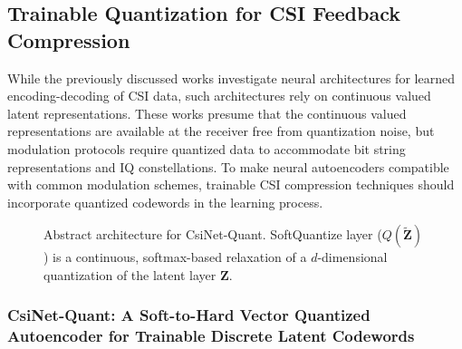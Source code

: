 
\subsection{Trainable Quantization for CSI Feedback Compression}

While the previously discussed works investigate neural architectures for learned encoding-decoding of CSI data, such architectures rely on continuous valued latent representations. These works presume that the continuous valued representations are available at the receiver free from quantization noise, but modulation protocols require quantized data to accommodate bit string representations and IQ constellations. To make neural autoencoders compatible with common modulation schemes, trainable CSI compression techniques should incorporate quantized codewords in the learning process.

\begin{figure}[!hbtp]
\centering
\def\svgwidth{0.8\columnwidth}

\caption{Abstract architecture for CsiNet-Quant. SoftQuantize layer ($Q(\tilde{\mathbf Z})$) is a continuous, softmax-based relaxation of a $d$-dimensional quantization of the latent layer $\mathbf Z$.}
\label{fig:csinet_quant}
\end{figure}

\subsubsection{CsiNet-Quant: A Soft-to-Hard Vector Quantized Autoencoder for Trainable Discrete Latent Codewords}


